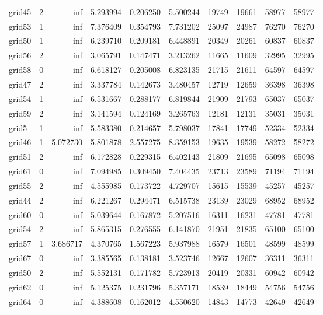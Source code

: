 \begin{longtable}{|l|r|r|r|r|r|r|r|r|r|}
grid45 & 2 & inf & 5.293994 & 0.206250 & 5.500244 & 19749 & 19661 & 58977 & 58977 \\
grid53 & 1 & inf & 7.376409 & 0.354793 & 7.731202 & 25097 & 24987 & 76270 & 76270 \\
grid50 & 1 & inf & 6.239710 & 0.209181 & 6.448891 & 20349 & 20261 & 60837 & 60837 \\
grid56 & 2 & inf & 3.065791 & 0.147471 & 3.213262 & 11665 & 11609 & 32995 & 32995 \\
grid58 & 0 & inf & 6.618127 & 0.205008 & 6.823135 & 21715 & 21611 & 64597 & 64597 \\
grid47 & 2 & inf & 3.337784 & 0.142673 & 3.480457 & 12719 & 12659 & 36398 & 36398 \\
grid54 & 1 & inf & 6.531667 & 0.288177 & 6.819844 & 21909 & 21793 & 65037 & 65037 \\
grid59 & 2 & inf & 3.141594 & 0.124169 & 3.265763 & 12181 & 12131 & 35031 & 35031 \\
grid5 & 1 & inf & 5.583380 & 0.214657 & 5.798037 & 17841 & 17749 & 52334 & 52334 \\
grid46 & 1 & 5.072730 & 5.801878 & 2.557275 & 8.359153 & 19635 & 19539 & 58272 & 58272 \\
grid51 & 2 & inf & 6.172828 & 0.229315 & 6.402143 & 21809 & 21695 & 65098 & 65098 \\
grid61 & 0 & inf & 7.094985 & 0.309450 & 7.404435 & 23713 & 23589 & 71194 & 71194 \\
grid55 & 2 & inf & 4.555985 & 0.173722 & 4.729707 & 15615 & 15539 & 45257 & 45257 \\
grid44 & 2 & inf & 6.221267 & 0.294471 & 6.515738 & 23139 & 23029 & 68952 & 68952 \\
grid60 & 0 & inf & 5.039644 & 0.167872 & 5.207516 & 16311 & 16231 & 47781 & 47781 \\
grid54 & 2 & inf & 5.865315 & 0.276555 & 6.141870 & 21951 & 21835 & 65100 & 65100 \\
grid57 & 1 & 3.686717 & 4.370765 & 1.567223 & 5.937988 & 16579 & 16501 & 48599 & 48599 \\
grid67 & 0 & inf & 3.385565 & 0.138181 & 3.523746 & 12667 & 12607 & 36311 & 36311 \\
grid50 & 2 & inf & 5.552131 & 0.171782 & 5.723913 & 20419 & 20331 & 60942 & 60942 \\
grid62 & 0 & inf & 5.125375 & 0.231796 & 5.357171 & 18539 & 18449 & 54756 & 54756 \\
grid64 & 0 & inf & 4.388608 & 0.162012 & 4.550620 & 14843 & 14773 & 42649 & 42649 \\

\end{longtable}
